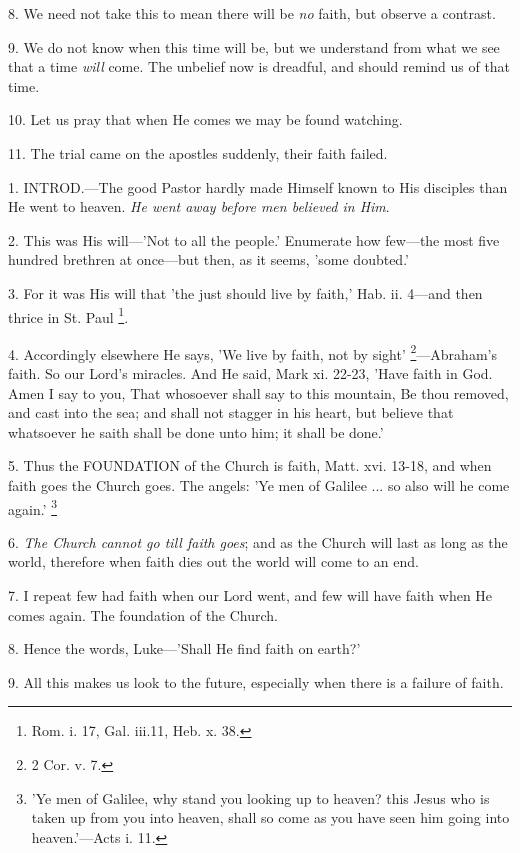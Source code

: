 8. We need not take this to mean there will be \emph{no}
faith, but observe a contrast.

9. We do not know when this time will be, but we
understand from what we see that a time \emph{will} come. The unbelief
now is dreadful, and should remind us of that time.

10. Let us pray that when He comes we may be
found watching.

11. The trial came on the apostles suddenly,
their faith failed.


1. INTROD.—The
good Pastor hardly made Himself known to His disciples than He went to
heaven. \emph{He went away before men believed in Him}.

2. This was His will—'Not to all the people.'
Enumerate how few—the most five hundred brethren at once—but then,
as it seems, 'some doubted.'

3. For it was His will that 'the just should live
by faith,' Hab. ii. 4—and then thrice in St. Paul \footnote{Rom. i. 17, Gal. iii.11,
Heb. x. 38.}.

4. Accordingly elsewhere He says, 'We live by
faith, not by sight' \footnote{2 Cor. v. 7.}—Abraham's
faith. So our Lord's miracles. And He said, Mark xi. 22-23, 'Have
faith in God. Amen I say to you, That whosoever shall say to this
mountain, Be thou removed, and cast into the sea; and shall not
stagger in his heart, but believe that whatsoever he saith shall be
done unto him; it shall be done.'

5. Thus the FOUNDATION
of the Church is faith, Matt. xvi. 13-18, and when faith goes the
Church goes. The angels: 'Ye men of Galilee ... so also will he come
again.' \footnote{'Ye men of Galilee, why
stand you looking up to heaven? this Jesus who is taken up from you
into heaven, shall so come as you have seen him going into
heaven.'—Acts i. 11.}

6. \emph{The Church cannot go till faith goes};
and as the Church will last as long as the world, therefore when faith
dies out the world will come to an end.

7. I repeat few had faith when our Lord went, and
few will have faith when He comes again. The foundation of the Church.

8. Hence the words, Luke—'Shall He find faith
on earth?'

9. All this makes us look to the future,
especially when there is a failure of faith.


